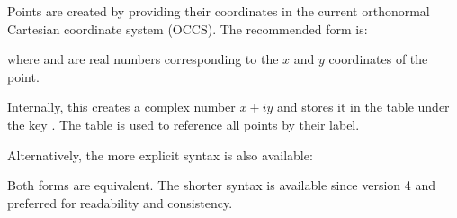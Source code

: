 Points are created by providing their coordinates in the current orthonormal Cartesian coordinate system (OCCS). The recommended form is:

\begin{mybox}
\end{mybox}

where  and  are real numbers corresponding to the $x$ and $y$ coordinates of the point.

\medskip
\noindent
Internally, this creates a complex number $x + i y$ and stores it in the table  under the key . The table  is used to reference all points by their label.

\medskip
\noindent
Alternatively, the more explicit syntax is also available:

\begin{center}
\end{center}

\noindent
Both forms are equivalent. The shorter syntax is available since version 4 and preferred for readability and consistency.


